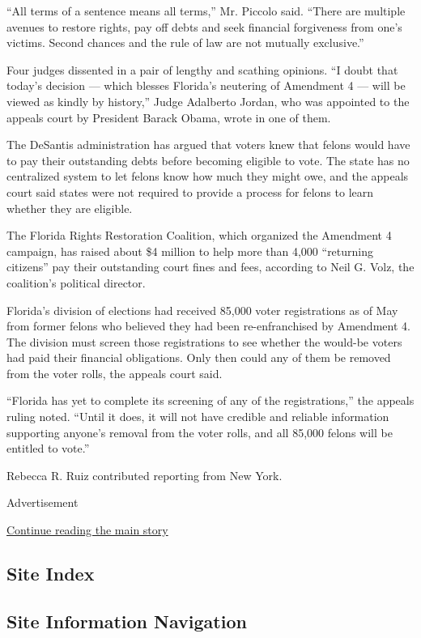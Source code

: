 ``All terms of a sentence means all terms,'' Mr. Piccolo said. ``There
are multiple avenues to restore rights, pay off debts and seek financial
forgiveness from one's victims. Second chances and the rule of law are
not mutually exclusive.''

Four judges dissented in a pair of lengthy and scathing opinions. ``I
doubt that today's decision --- which blesses Florida's neutering of
Amendment 4 --- will be viewed as kindly by history,'' Judge Adalberto
Jordan, who was appointed to the appeals court by President Barack
Obama, wrote in one of them.

The DeSantis administration has argued that voters knew that felons
would have to pay their outstanding debts before becoming eligible to
vote. The state has no centralized system to let felons know how much
they might owe, and the appeals court said states were not required to
provide a process for felons to learn whether they are eligible.

The Florida Rights Restoration Coalition, which organized the Amendment
4 campaign, has raised about \$4 million to help more than 4,000
``returning citizens'' pay their outstanding court fines and fees,
according to Neil G. Volz, the coalition's political director.

Florida's division of elections had received 85,000 voter registrations
as of May from former felons who believed they had been re-enfranchised
by Amendment 4. The division must screen those registrations to see
whether the would-be voters had paid their financial obligations. Only
then could any of them be removed from the voter rolls, the appeals
court said.

``Florida has yet to complete its screening of any of the
registrations,'' the appeals ruling noted. ``Until it does, it will not
have credible and reliable information supporting anyone's removal from
the voter rolls, and all 85,000 felons will be entitled to vote.''

Rebecca R. Ruiz contributed reporting from New York.

Advertisement

\protect\hyperlink{after-bottom}{Continue reading the main story}

\hypertarget{site-index}{%
\subsection{Site Index}\label{site-index}}

\hypertarget{site-information-navigation}{%
\subsection{Site Information
Navigation}\label{site-information-navigation}}

